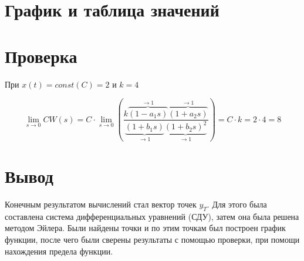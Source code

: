 \documentclass[a4paper, 12pt]{article}
\begin{document}
\section{График и таблица значений}


\begin{center}
\end{center}

\section{Проверка}

При $x(t) = const (C) = 2$ и $k = 4$

$$
    \lim_{s\to0}CW(s) = C \cdot \lim_{s\to0}\left(\dfrac{
        k\overbrace{(1-a_1s)}^{\to1}\overbrace{(1+a_2s)}^{\to1}
    }{
        \underbrace{(1+b_1s)}_{\to1}\underbrace{(1+b_2s)^2}_{\to1}
    }\right) = C \cdot k = 2 \cdot 4 = 8
$$

\section{Вывод}
Конечным результатом вычислений стал вектор точек $y_T$. Для этого была составлена система дифференциальных уравнений (СДУ), затем она была решена методом Эйлера. Были найдены точки и по этим точкам был построен график функции, после чего были сверены результаты с помощью проверки, при помощи нахождения предела функции. 
\end{document}
